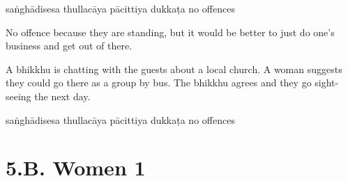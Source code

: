 \begin{exam}{\autoExamName}
\begin{problem*}
\begin{parts}
  \bigskip

  \begin{answers}{5}
    \bChoices
     saṅghādisesa\eAns
     thullacāya\eAns
     pācittiya\eAns
     dukkaṭa\eAns
     no offences\eAns
    \eChoices
  \end{answers}

  \begin{solution}
    No offence because they are standing, but it would be better to just do
    one's business and get out of there.
  \end{solution}

  \bigskip

\item A bhikkhu is chatting with the guests about a local church. A woman
  suggests they could go there as a group by bus. The bhikkhu agrees and they go
  sight-seeing the next day.

  \bigskip

  \begin{answers}{5}
    \bChoices
     saṅghādisesa\eAns
     thullacāya\eAns
     pācittiya\eAns
     dukkaṭa\eAns
     no offences\eAns
    \eChoices
  \end{answers}

\end{parts}

\end{problem*}

\end{exam}

\chapter{5.B. Women 1}
\renewcommand*{\theChapterTitle}{5.B. Women 1}
